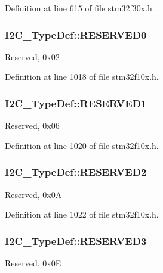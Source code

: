 Definition at line 615 of file stm32f30x.\-h.

\hypertarget{struct_i2_c___type_def_aee6ec4cf81ee0bb5b038576ba0d738a2}{
\subsubsection[{R\-E\-S\-E\-R\-V\-E\-D0}]{ I2\-C\-\_\-\-Type\-Def\-::\-R\-E\-S\-E\-R\-V\-E\-D0}}\label{struct_i2_c___type_def_aee6ec4cf81ee0bb5b038576ba0d738a2}
Reserved, 0x02 

Definition at line 1018 of file stm32f10x.\-h.

\hypertarget{struct_i2_c___type_def_a6c3d147223993f2b832b508ee5a5178e}{
\subsubsection[{R\-E\-S\-E\-R\-V\-E\-D1}]{ I2\-C\-\_\-\-Type\-Def\-::\-R\-E\-S\-E\-R\-V\-E\-D1}}\label{struct_i2_c___type_def_a6c3d147223993f2b832b508ee5a5178e}
Reserved, 0x06 

Definition at line 1020 of file stm32f10x.\-h.

\hypertarget{struct_i2_c___type_def_a5e98c83a176deeb4a8a68f9ca12fdfd2}{
\subsubsection[{R\-E\-S\-E\-R\-V\-E\-D2}]{ I2\-C\-\_\-\-Type\-Def\-::\-R\-E\-S\-E\-R\-V\-E\-D2}}\label{struct_i2_c___type_def_a5e98c83a176deeb4a8a68f9ca12fdfd2}
Reserved, 0x0\-A 

Definition at line 1022 of file stm32f10x.\-h.

\hypertarget{struct_i2_c___type_def_a355b2c5aa0dd467de1f9dea4a9afe986}{
\subsubsection[{R\-E\-S\-E\-R\-V\-E\-D3}]{ I2\-C\-\_\-\-Type\-Def\-::\-R\-E\-S\-E\-R\-V\-E\-D3}}\label{struct_i2_c___type_def_a355b2c5aa0dd467de1f9dea4a9afe986}
Reserved, 0x0\-E 

